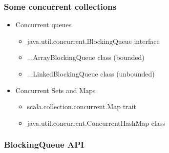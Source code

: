 \documentclass[aspectratio=169]{beamer}
\begin{document}
\begin{frame}[t]\frametitle{Some concurrent collections}
    
  \begin{itemize}
    \item Concurrent queues 
      \begin{itemize}
         \item java.util.concurrent.BlockingQueue interface
        \item ...ArrayBlockingQueue class (bounded)
        \item ...LinkedBlockingQueue class (unbounded)
       \end{itemize} 
    \item Concurrent Sets and Maps
      \begin{itemize}
        \item scala.collection.concurrent.Map trait
        \item java.util.concurrent.ConcurrentHashMap class
      \end{itemize}
  \end{itemize}
\end{frame}

\begin{frame}[t]\frametitle{BlockingQueue API}
    \centering

\end{frame}
\end{document}
